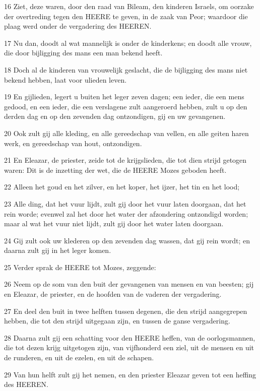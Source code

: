 \par 16 Ziet, deze waren, door den raad van Bileam, den kinderen Israels, om oorzake der overtreding tegen den HEERE te geven, in de zaak van Peor; waardoor die plaag werd onder de vergadering des HEEREN.
\par 17 Nu dan, doodt al wat mannelijk is onder de kinderkens; en doodt alle vrouw, die door bijligging des mans een man bekend heeft.
\par 18 Doch al de kinderen van vrouwelijk geslacht, die de bijligging des mans niet bekend hebben, laat voor ulieden leven.
\par 19 En gijlieden, legert u buiten het leger zeven dagen; een ieder, die een mens gedood, en een ieder, die een verslagene zult aangeroerd hebben, zult u op den derden dag en op den zevenden dag ontzondigen, gij en uw gevangenen.
\par 20 Ook zult gij alle kleding, en alle gereedschap van vellen, en alle geiten haren werk, en gereedschap van hout, ontzondigen.
\par 21 En Eleazar, de priester, zeide tot de krijgslieden, die tot dien strijd getogen waren: Dit is de inzetting der wet, die de HEERE Mozes geboden heeft.
\par 22 Alleen het goud en het zilver, en het koper, het ijzer, het tin en het lood;
\par 23 Alle ding, dat het vuur lijdt, zult gij door het vuur laten doorgaan, dat het rein worde; evenwel zal het door het water der afzondering ontzondigd worden; maar al wat het vuur niet lijdt, zult gij door het water laten doorgaan.
\par 24 Gij zult ook uw klederen op den zevenden dag wassen, dat gij rein wordt; en daarna zult gij in het leger komen.
\par 25 Verder sprak de HEERE tot Mozes, zeggende:
\par 26 Neem op de som van den buit der gevangenen van mensen en van beesten; gij en Eleazar, de priester, en de hoofden van de vaderen der vergadering.
\par 27 En deel den buit in twee helften tussen degenen, die den strijd aangegrepen hebben, die tot den strijd uitgegaan zijn, en tussen de ganse vergadering.
\par 28 Daarna zult gij een schatting voor den HEERE heffen, van de oorlogsmannen, die tot dezen krijg uitgetogen zijn, van vijfhonderd een ziel, uit de mensen en uit de runderen, en uit de ezelen, en uit de schapen.
\par 29 Van hun helft zult gij het nemen, en den priester Eleazar geven tot een heffing des HEEREN.
